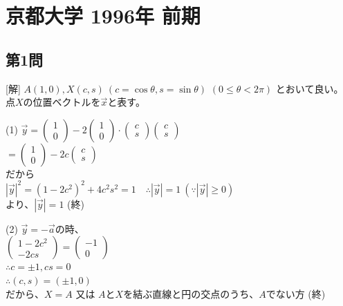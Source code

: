 \documentclass[../main.tex]{subfiles}
\begin{document}
\section*{京都大学 1996年 前期}

\subsection*{第1問}
[解] $A(1,0), X(c,s) \ (c=\cos\theta, s=\sin\theta)$
$(0 \le \theta < 2\pi)$ とおいて良い。
点$X$の位置ベクトルを$\vec{x}$と表す。

\begin{center}
\end{center}

(1) $\vec{y} =
\begin{pmatrix} 1 \\ 0
\end{pmatrix} - 2
\begin{pmatrix} 1 \\ 0
\end{pmatrix} \cdot
\begin{pmatrix} c \\ s
\end{pmatrix}
\begin{pmatrix} c \\ s
\end{pmatrix}$ \\
$ =
\begin{pmatrix} 1 \\ 0
\end{pmatrix} - 2c
\begin{pmatrix} c \\ s
\end{pmatrix}$ \\
だから \\
$|\vec{y}|^2 = (1-2c^2)^2 + 4c^2s^2 = 1 \quad \therefore |\vec{y}|=1 \ (\because |\vec{y}| \ge 0)$ \\
より、$|\vec{y}| = 1$ \hfill(終)

(2) $\vec{y} = -\vec{a}$の時、\\
$
\begin{pmatrix} 1-2c^2 \\ -2cs
\end{pmatrix} =
\begin{pmatrix} -1 \\ 0
\end{pmatrix}$ \\
$\therefore c=\pm 1, cs=0$ \\
$\therefore (c,s) = (\pm 1, 0)$ \\
だから、$X=A$ 又は $A$と$X$を結ぶ直線と円の交点のうち、$A$でない方 \hfill(終)
\end{document}
